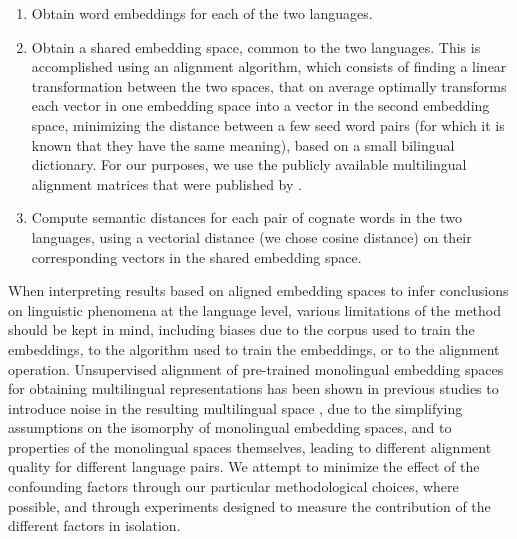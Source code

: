 \documentclass[output=paper]{langsci/langscibook}
\begin{document}
\begin{enumerate}
\item Obtain word embeddings for each of the two languages.
\item Obtain a shared embedding space, common to the two languages. This is accomplished using an alignment algorithm, which consists of finding a linear transformation between the two spaces, that on average optimally transforms each vector in one embedding space into a vector in the second embedding space, minimizing the distance between a few seed word pairs (for which it is known that they have the same meaning), based on a small bilingual dictionary. For our purposes, we use the publicly available multilingual alignment matrices that were published by \citet{align_4}.
\item Compute semantic distances for each pair of cognate words in the two languages, using a vectorial distance (we chose cosine distance) on their corresponding vectors in the shared embedding space.
\end{enumerate}


When interpreting results based on aligned embedding spaces to infer conclusions on linguistic phenomena at the language level, various limitations of the method should be kept in mind, including biases due to the corpus used to train the embeddings, to the algorithm used to train the embeddings, or to the alignment operation. Unsupervised alignment of pre-trained monolingual embedding spaces for obtaining multilingual representations has been shown in previous studies to introduce noise in the resulting multilingual space \citep{cognatesuban:sogaard2018limitations,cognatesuban:beinborn2019semantic,cognatesuban:patra2019bilingual}, due to the simplifying assumptions on the isomorphy of monolingual embedding spaces, and to properties of the monolingual spaces themselves, leading to different alignment quality for different language pairs.
We attempt to minimize the effect of the confounding factors through our particular methodological choices, where possible, and through experiments designed to measure the contribution of the different factors in isolation.\largerpage[-1]
\end{document}
